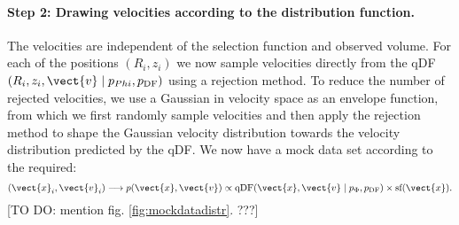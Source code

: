 \paragraph{Step 2: Drawing velocities according to the distribution function.} The velocities are independent of the selection function and observed volume. For each of the positions $(R_i,z_i)$ we now sample velocities directly from the qDF$(R_i,z_i,\vect{v} \mid p_{Phi},p_\text{DF})$ using a rejection method. To reduce the number of rejected velocities, we use a Gaussian in velocity space as an envelope function, from which we first randomly sample velocities and then apply the rejection method to shape the Gaussian velocity distribution towards the velocity distribution predicted by the qDF. We now have a mock data set according to the required:
\begin{equation*}
(\vect{x}_i,\vect{v}_i) \longrightarrow p(\vect{x},\vect{v}) \propto \text{qDF}(\vect{x},\vect{v} \mid p_{\Phi},p_\text{DF}) \times \text{sf}(\vect{x}).
\end{equation*} 
[TO DO: mention fig. \ref{fig:mockdatadistr}. ???]



